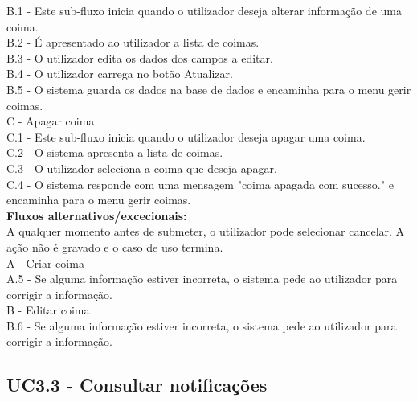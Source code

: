 	\indent\indent B.1 - Este sub-fluxo inicia quando o utilizador deseja alterar informação de uma coima.\\
	\indent\indent B.2 - É apresentado ao utilizador a lista de coimas.\\
	\indent\indent B.3 - O utilizador edita os dados dos campos a editar.\\
	\indent\indent B.4 - O utilizador carrega no botão Atualizar.\\
	\indent\indent B.5 - O sistema guarda os dados na base de dados e encaminha para o menu gerir coimas.\\
	\indent C - Apagar coima  \\
	\indent\indent C.1 - Este sub-fluxo inicia quando o utilizador deseja apagar uma coima.\\
	\indent\indent C.2 - O sistema apresenta a lista de coimas.\\
	\indent\indent C.3 - O utilizador seleciona a coima que deseja apagar.\\
	\indent\indent C.4 - O sistema responde com uma mensagem "coima apagada com sucesso." e encaminha para o menu gerir coimas.\\
\textbf{Fluxos alternativos/excecionais:}  \\
	\indent A qualquer momento antes de submeter, o utilizador pode selecionar cancelar. A ação não é gravado e o caso de uso termina.\\
	\indent A - Criar coima\\
	\indent\indent A.5 - Se alguma informação estiver incorreta, o sistema pede ao utilizador para corrigir a informação.\\
	\indent B - Editar coima\\
	\indent\indent B.6 - Se alguma informação estiver incorreta, o sistema pede ao utilizador para corrigir a informação.\\

\newpage

\newpage

\subsection{UC3.3 - Consultar notificações}
\vspace*{5mm}

